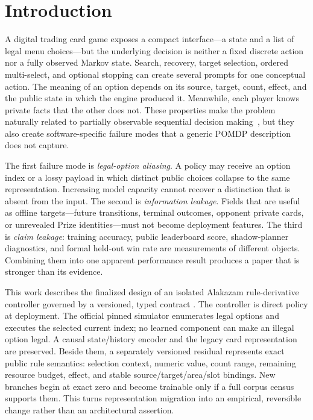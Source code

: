 \section{Introduction}

A digital trading card game exposes a compact interface---a state and a list of
legal menu choices---but the underlying decision is neither a fixed discrete
action nor a fully observed Markov state. Search, recovery, target selection,
ordered multi-select, and optional stopping can create several prompts for one
conceptual action. The meaning of an option depends on its source, target,
count, effect, and the public state in which the engine produced it. Meanwhile,
each player knows private facts that the other does not. These properties make
the problem naturally related to partially observable sequential decision
making~\cite{kaelbling1998planning,sutton2018reinforcement}, but they also create
software-specific failure modes that a generic POMDP description does not
capture.

The first failure mode is \emph{legal-option aliasing}. A policy may receive an
option index or a lossy payload in which distinct public choices collapse to
the same representation. Increasing model capacity cannot recover a distinction
that is absent from the input. The second is \emph{information leakage}. Fields
that are useful as offline targets---future transitions, terminal outcomes,
opponent private cards, or unrevealed Prize identities---must not become
deployment features. The third is \emph{claim leakage}: training accuracy,
public leaderboard score, shadow-planner diagnostics, and formal held-out win
rate are measurements of different objects. Combining them into one apparent
performance result produces a paper that is stronger than its evidence.

This work describes the finalized design of an isolated Alakazam
rule-derivative controller governed by a versioned, typed contract
\cite{projectContract2026}. The controller is direct policy at deployment. The
official pinned simulator enumerates legal options and executes the selected
current index; no learned component can make an illegal option legal. A causal
state/history encoder and the legacy card representation are preserved. Beside
them, a separately versioned residual represents exact public rule semantics:
selection context, numeric value, count range, remaining resource budget,
effect, and stable source/target/area/slot bindings. New branches begin at exact
zero and become trainable only if a full corpus census supports them. This
turns representation migration into an empirical, reversible change rather
than an architectural assertion.

